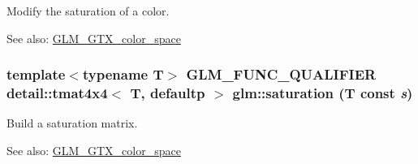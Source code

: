 Modify the saturation of a color. \begin{Desc}
\item[See also:]\hyperlink{group__gtx__color__space}{GLM\_\-GTX\_\-color\_\-space} \end{Desc}
\hypertarget{group__gtx__color__space_g53a08c053e194bad0bfc172ef950bfe7}{
\subsubsection[saturation]{\setlength{\rightskip}{0pt plus 5cm}template$<$typename T$>$ GLM\_\-FUNC\_\-QUALIFIER detail::tmat4x4$<$ T, defaultp $>$ glm::saturation (T const  {\em s})}}
\label{group__gtx__color__space_g53a08c053e194bad0bfc172ef950bfe7}


Build a saturation matrix. \begin{Desc}
\item[See also:]\hyperlink{group__gtx__color__space}{GLM\_\-GTX\_\-color\_\-space} \end{Desc}
